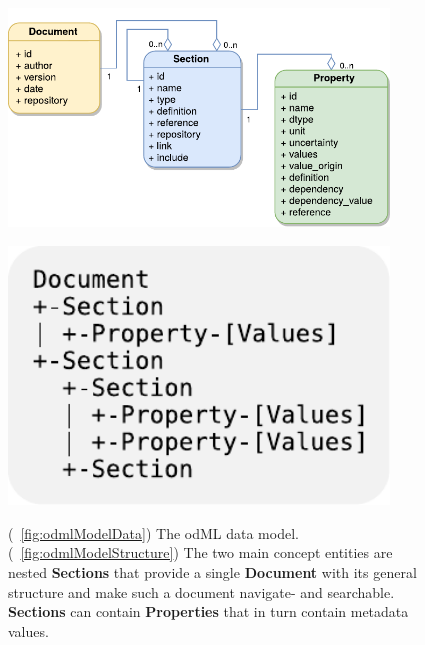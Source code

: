 \documentclass{article}
\begin{document}
\begin{figure}
   \begin{minipage}[b]{.6\linewidth}
     \centering
     \includegraphics[width=0.9\textwidth]{figures/figOdmlModelA.pdf}
     \label{fig:odmlModelData}
   \end{minipage}
   \hfill
   \begin{minipage}[b]{.35\linewidth}
     \centering
     \includegraphics[width=0.9\textwidth]{figures/figOdmlModelB.pdf}
     \label{fig:odmlModelStructure}
   \end{minipage}
   \caption{
(~\ref{fig:odmlModelData}) The odML data model. (~\ref{fig:odmlModelStructure}) The two main concept entities are nested \textbf{Sections} that provide a single \textbf{Document} with its general structure and make such a document navigate- and searchable. \textbf{Sections} can contain \textbf{Properties} that in turn contain metadata values.}
   \label{fig:odmlModel}
\end{figure}
\end{document}
